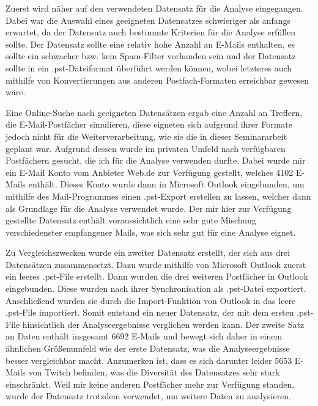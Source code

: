 \noindent Zuerst wird näher auf den verwendeten Datensatz für die Analyse eingegangen. Dabei war die Auswahl eines geeigneten Datensatzes schwieriger als anfangs erwartet, da der Datensatz auch bestimmte Kriterien für die Analyse erfüllen sollte. Der Datensatz sollte eine relativ hohe Anzahl an E-Mails enthalten, es sollte ein schwacher bzw. kein Spam-Filter vorhanden sein und der Datensatz sollte in ein .pst-Dateiformat überführt werden können, wobei letzteres auch mithilfe von Konvertierungen aus anderen Postfach-Formaten erreichbar gewesen wäre. \smallskip

\noindent Eine Online-Suche nach geeigneten Datensätzen ergab eine Anzahl an Treffern, die E-Mail-Postfächer simulieren, diese eigneten sich aufgrund ihrer Formate jedoch nicht für die Weiterverarbeitung, wie sie die in dieser Seminararbeit geplant war. Aufgrund dessen wurde im privaten Umfeld nach verfügbaren Postfächern gesucht, die ich für die Analyse verwenden durfte. Dabei wurde mir ein E-Mail Konto vom Anbieter \glqq{}Web.de\grqq{} zur Verfügung gestellt, welches 4102 E-Mails enthält. Dieses Konto wurde dann in Microsoft Outlook eingebunden, um mithilfe des Mail-Programmes einen .pst-Export erstellen zu lassen, welcher dann als Grundlage für die Analyse verwendet wurde. Der mir hier zur Verfügung gestellte Datensatz enthält voraussichtlich eine sehr gute Mischung verschiedenster empfangener Mails, was sich sehr gut für eine Analyse eignet. \smallskip

\noindent Zu Vergleichszwecken wurde ein zweiter Datensatz erstellt, der sich aus drei Datensätzen zusammensetzt. Dazu wurde mithilfe von Microsoft Outlook zuerst ein leeres .pst-File erstellt. Dann wurden die drei weiteren Postfächer in Outlook eingebunden. Diese wurden nach ihrer Synchronisation als .pst-Datei exportiert. Anschließend wurden sie durch die Import-Funktion von Outlook in das leere .pst-File importiert. Somit entstand ein neuer Datensatz, der mit dem ersten .pst-File hinsichtlich der Analyseergebnisse verglichen werden kann. Der zweite Satz an Daten enthält insgesamt 6692 E-Mails und bewegt sich daher in einem ähnlichen Größenumfeld wie der erste Datensatz, was die Analyseergebnisse besser vergleichbar macht. Anzumerken ist, dass es sich darunter leider 5653 E-Mails von \glqq{}Twitch\grqq{} befinden, was die Diversität des Datensatzes sehr stark einschränkt. Weil mir keine anderen Postfächer mehr zur Verfügung standen, wurde der Datensatz trotzdem verwendet, um weitere Daten zu analysieren.
\newpage